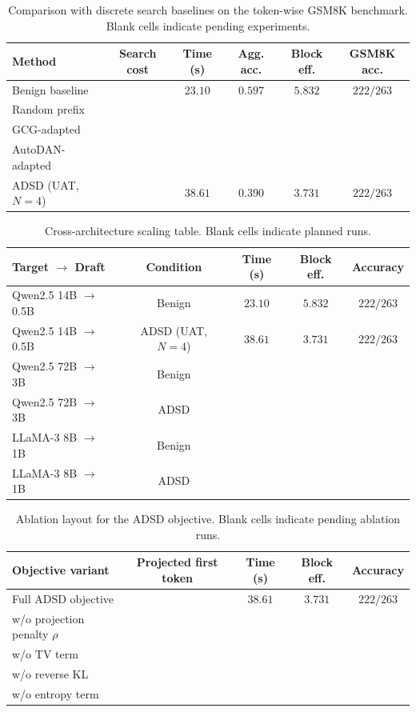 \begin{table}[t]
\centering
\caption{Comparison with discrete search baselines on the token-wise GSM8K
benchmark. Blank cells indicate pending experiments.}
\label{tab:baseline-comparison}
\footnotesize
\begin{tabular}{lccccc}
\toprule
Method & Search cost & Time (s) & Agg. acc. & Block eff. & GSM8K acc. \\
\midrule
Benign baseline &  & $23.10$ & $0.597$ & $5.832$ & $222/263$ \\
Random prefix &  &  &  &  &  \\
GCG-adapted &  &  &  &  &  \\
AutoDAN-adapted &  &  &  &  &  \\
ADSD (UAT, $N=4$) &  & $38.61$ & $0.390$ & $3.731$ & $222/263$ \\
\bottomrule
\end{tabular}
\end{table}

\begin{table}[t]
\centering
\caption{Cross-architecture scaling table. Blank cells indicate planned runs.}
\label{tab:scaling-placeholder}
\footnotesize
\begin{tabular}{lcccc}
\toprule
Target $\rightarrow$ Draft & Condition & Time (s) & Block eff. & Accuracy \\
\midrule
Qwen2.5 14B $\rightarrow$ 0.5B & Benign & $23.10$ & $5.832$ & $222/263$ \\
Qwen2.5 14B $\rightarrow$ 0.5B & ADSD (UAT, $N=4$) & $38.61$ & $3.731$ & $222/263$ \\
Qwen2.5 72B $\rightarrow$ 3B & Benign &  &  &  \\
Qwen2.5 72B $\rightarrow$ 3B & ADSD &  &  &  \\
LLaMA-3 8B $\rightarrow$ 1B & Benign &  &  &  \\
LLaMA-3 8B $\rightarrow$ 1B & ADSD &  &  &  \\
\bottomrule
\end{tabular}
\end{table}

\begin{table}[t]
\centering
\caption{Ablation layout for the ADSD objective. Blank cells indicate pending
ablation runs.}
\label{tab:ablation-placeholder}
\footnotesize
\begin{tabular}{lcccc}
\toprule
Objective variant & Projected first token & Time (s) & Block eff. & Accuracy \\
\midrule
Full ADSD objective &  & $38.61$ & $3.731$ & $222/263$ \\
w/o projection penalty $\rho$ &  &  &  &  \\
w/o TV term &  &  &  &  \\
w/o reverse KL &  &  &  &  \\
w/o entropy term &  &  &  &  \\
\bottomrule
\end{tabular}
\end{table}

